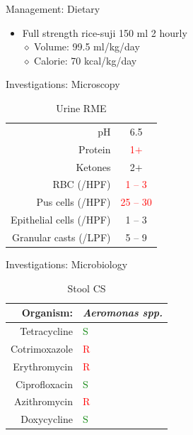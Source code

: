 \documentclass[10pt]{beamer}
\begin{document}
{
\begin{frame}{Management: Dietary}
	\begin{itemize}
		\item Full strength rice-suji 150 ml 2 hourly\\
		{\color{lgreen}$\diamond$} Volume: 99.5 ml/kg/day\\
		{\color{lgreen}$\diamond$} Calorie: 70 kcal/kg/day
	\end{itemize}
\end{frame}
}


{
\begin{frame}{Investigations: Microscopy}
  \begin{table}
  	\caption{Urine RME}
  	\begin{tabular}{r|c}
  		\toprule
  		pH 					& 6.5\\
  		Protein 			& \textcolor{red}{1$+$}\\
  		Ketones				& 2$+$\\
  		RBC (/HPF) 			& \textcolor{red}{1 -- 3}\\
  		Pus cells (/HPF) 	& \textcolor{red}{25 -- 30}\\
  		Epithelial cells (/HPF)	& 1 -- 3\\
  		Granular casts (/LPF) 	& 5 -- 9\\
  		\bottomrule
  	\end{tabular}
  \end{table}
\end{frame}
}

{
\begin{frame}{Investigations: Microbiology}
  \begin{table}
  	\caption{Stool CS}
  	\begin{tabular}{r l}
  		\toprule
  		Organism: & \textit{Aeromonas spp.}\\
  		\midrule
  		Tetracycline & \textcolor{green}{S} \\
  		Cotrimoxazole & \textcolor{red}{R} \\
  		Erythromycin & \textcolor{red}{R}\\
  		Ciprofloxacin & \textcolor{green}{S} \\
  		Azithromycin & \textcolor{red}{R} \\
  		Doxycycline & \textcolor{green}{S} \\
  		\bottomrule
  	\end{tabular}
  \end{table}
\end{frame}
}
\end{document}
